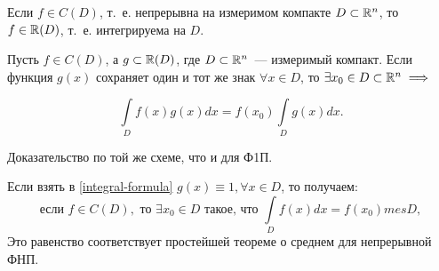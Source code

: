 \documentclass[../main.tex]{subfiles}
\begin{document}
\begin{thm}
	Если $f \in C(D)$, т.~е. непрерывна на измеримом компакте
	 $D \subset \mathbb{R}^n$, то $f \in \mathbb{R}(D)$,
	т.~е. интегрируема на $D$.
\end{thm}
\begin{crl*}
	Пусть $f \in C(D)$, а $g \subset \mathbb{R}(D)$, где $D \subset \mathbb{R}^n$~---
	 измеримый компакт. Если функция $g(x)$ сохраняет один и 
	 тот же знак $\forall x \in D $, то $\exists x_0 \in D \subset \mathbb{R}^n \implies$
	
	\begin{equation}
	\label{integral-formula}
	\int\limits_D f(x)g(x)dx =
	f(x_0)\int\limits_Dg(x)dx.
	\end{equation}
	
	Доказательство по той же схеме, что и для Ф1П.
\end{crl*}
\begin{rem}
	Если взять в \eqref{integral-formula} 
	$g(x) \equiv 1, \forall x \in D$, то получаем:
	\[
		\text{если } f \in C(D), 
		\text{ то }\exists x_0 \in D 
		\text{ такое, что } \int\limits_Df(x)dx = f(x_0) mes D,
	\]
	Это равенство соответствует простейшей теореме о 
	среднем для непрерывной ФНП.
\end{rem}
\end{document}
